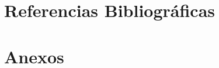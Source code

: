 \documentclass[12pt,letterpaper]{article}
\begin{document}
\section{Referencias Bibliográficas}
\printbibliography[heading=none]


\section{Anexos}
\end{document}
